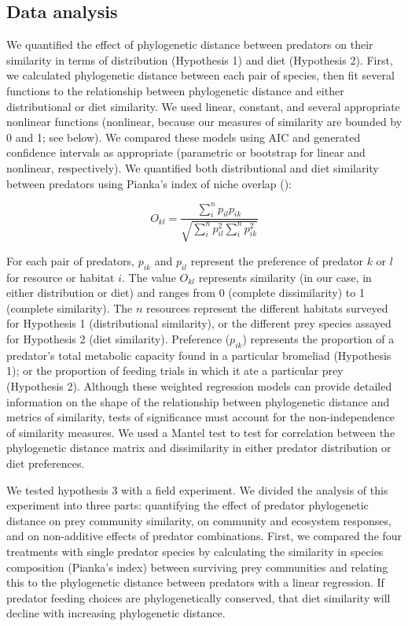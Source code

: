 \documentclass[11pt]{article}
\begin{document}
\subsection*{Data analysis}

We quantified the effect of phylogenetic distance between predators on their
similarity in terms of distribution (Hypothesis 1) and diet (Hypothesis 2).
First, we calculated phylogenetic distance between each pair of species, then
fit several functions to the relationship between phylogenetic distance and
either distributional or diet similarity. We used linear, constant, and
several appropriate nonlinear functions (nonlinear, because our measures of
similarity are bounded by 0 and 1; see below). We compared these models using
AIC and generated confidence intervals as appropriate (parametric or bootstrap
for linear and nonlinear, respectively). We quantified both distributional and
diet similarity between predators using Pianka's index of niche overlap
(\citealt{Pianka1974}):

\begin{equation}
{ O_{kl}=\frac{\sum_i^n{p_{il} p_{ik}}}{\sqrt{\sum_i^n{p_{il}^2} \sum_i^n{p_{ik}^2}}} }
\end{equation}

For each pair of predators, \(p_{ik}\) and \(p_{il}\) represent the
preference of predator \(k\) or \(l\) for resource or habitat \(i\). The
value \(O_{kl}\) represents similarity (in our case, in either
distribution or diet) and ranges from 0 (complete dissimilarity) to 1
(complete similarity). The \(n\) resources represent the different
habitats surveyed for Hypothesis 1 (distributional similarity), or the
different prey species assayed for Hypothesis 2 (diet similarity).
Preference (\(p_{ik}\)) represents the proportion of a predator's total
metabolic capacity found in a particular bromeliad (Hypothesis 1); or
the proportion of feeding trials in which it ate a particular prey
(Hypothesis 2). Although these weighted regression models can provide detailed information on the shape of the relationship between phylogenetic distance and metrics of similarity, tests of significance must account for the non-independence of similarity measures. We used a Mantel test to test for correlation between the phylogenetic distance matrix
and dissimilarity in either predator distribution or diet preferences.

We tested hypothesis 3 with a field experiment. We divided the analysis of this experiment into three parts: quantifying
the effect of predator phylogenetic distance on prey community similarity, on
community and ecosystem responses, and on non-additive effects of
predator combinations. First, we compared the four treatments with
single predator species by calculating the similarity in species
composition (Pianka's index) between surviving prey communities and
relating this to the phylogenetic distance between predators with a
linear regression. If predator feeding choices are phylogenetically
conserved, that diet similarity will decline with increasing
phylogenetic distance.
\end{document}
